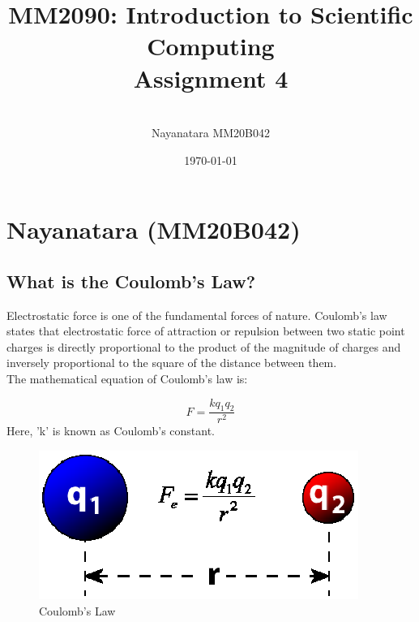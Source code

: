 \documentclass[a4paper, 12pt]{article}
\begin{document}
\title{\vspace{3cm}MM2090: Introduction to Scientific Computing\\
\vspace{1cm}
Assignment 4}
\author{\vspace{1cm}
\\Nayanatara MM20B042}
\date{\vspace{1cm}\today}
\maketitle
\newpage
\tableofcontents
\listoffigures

\vspace{5cm}
\section{Nayanatara (MM20B042)}

\vspace{0.5cm}
\subsection{What is the Coulomb's Law?}
Electrostatic force is one of the fundamental forces of nature. Coulomb's law states that electrostatic force of attraction or repulsion between two static point charges is directly proportional to the product of the magnitude of charges and inversely proportional to the square of the distance between them.
\\The mathematical equation of Coulomb's law is:

\begin{equation}
	F = \frac{kq_1q_2}{r^2}
	\label{eqn:1}
\end{equation}
Here, 'k' is known as Coulomb's constant. 

\begin{figure}[h]
	\begin{center}
		\includegraphics[scale=1.5]{mm20b042.eps}
	\end{center}
	\caption{Coulomb's Law}
	\label{fig1}
\end{figure}
\end{document}
